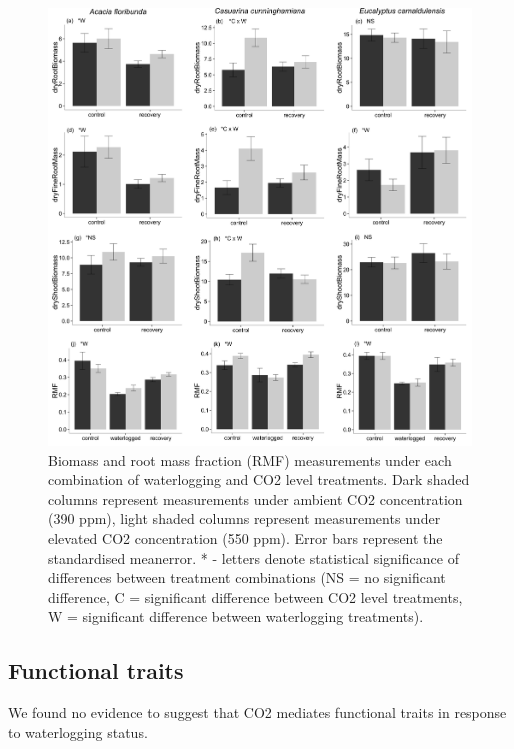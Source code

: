 \documentclass[12pt,a4paper]{memoir}
\begin{document}
\begin{figure}[h!t]
\begin{center}
\includegraphics[width=\linewidth, keepaspectratio=true]{biomass2.png} %
\caption[Biomass and root mass fraction (RMF) measurements under each combination of waterlogging and CO2 level treatments.]{\small{Biomass and root mass fraction (RMF) measurements under each combination of waterlogging and CO2 level treatments. Dark shaded columns represent measurements under ambient CO2 concentration (390 ppm), light shaded columns represent measurements under elevated CO2 concentration (550 ppm). Error bars represent the standardised meanerror. * - letters denote statistical significance of differences between treatment combinations (NS = no significant difference, C = significant difference between CO2 level treatments, W = significant difference between waterlogging treatments).}} %
\label{Ch5_F2} %
\end{center}
\end{figure}

\subsection*{Functional traits}
We found no evidence to suggest that CO2 mediates functional traits in response to waterlogging status.
\end{document}
